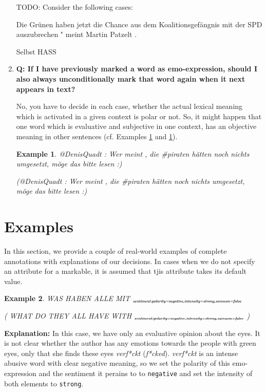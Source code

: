 \documentclass[11pt,a4paper]{article}
\theoremstyle{mytheoremstyle}
\newtheorem{exmp}{Example}[section]
\newcommand{\mtag}[2]{{\upshape[\emph{#2}\upshape]$_{\textrm{\bfseries\emph{\tiny
        #1}}}$}}
\newcommand{\sentiment}[2][]{\mtag{sen\-ti\-ment\ifstrempty{#1}{}{:#1}}{#2}}
\newcommand{\target}[2][]{\mtag{tar\-get\ifstrempty{#1}{}{:#1}}{#2}}
\newcommand{\emoexpression}[2][]{\mtag{emo-\-ex\-pression\ifstrempty{#1}{}{:#1}}{#2}}
\begin{document}
\begin{enumerate}
TODO: Consider the following cases:

Die Gr\"unen haben jetzt die Chance aus dem Koalitionsgef\"angnis mit
der SPD auszubrechen " meint Martin Patzelt .

Selbst HASS

\item\textbf{Q: If I have previously marked a word as emo-expression,
  should I also always unconditionally mark that word again when it
  next appears in text?}

No, you have to decide in each case, whether the actual lexical
meaning which is activated in a given context is polar or not.  So, it
might happen that one word which is evaluative and subjective in one
context, has an objective meaning in other sentences (cf. Examples
\ref{} and \ref{}).

\begin{exmp}
  @DenisQuadt : Wer meint , die \#piraten h\"atten noch nichts
  umgesetzt, m\"oge das bitte lesen :)

{\footnotesize(@DenisQuadt : Wer meint , die \#piraten h\"atten noch
  nichts umgesetzt, m\"oge das bitte lesen :)}\label{exmp:no-emoexpr}
\end{exmp}



\end{enumerate}

\section{Examples}

In this section, we provide a couple of real-world examples of
complete annotations with explanations of our decisions.  In cases
when we do not specify an attribute for a markable, it is assumed that
tjis attribute takes its default value.

\begin{exmp}
  \footnotesize WAS HABEN ALLE MIT
  \sentiment[polarity=negative,intensity=strong,sarcasm=false]{IHREN
    \emoexpression[polarity=negative,intensity=strong,sarcasm=false]{VERF*CKTEN}
    \target{GR\"UNEN AUGEN}}

  {\scriptsize( WHAT DO THEY ALL HAVE WITH
    \sentiment[polarity=negative,intensity=strong,sarcasm=false]{THEIR
      \emoexpression[polarity=negative,intensity=strong,sarcasm=false]{F*CKED}
      \target{GREEN EYES}} )}\label{exmp:sarcasm}
\end{exmp}

\textbf{Explanation:} In this case, we have only an evaluative opinion
about the eyes.  It is not clear whether the author has any emotions
towards the people with green eyes, only that she finds these eyes
\textit{verf*ckt} (\textit{f*cked}).  \textit{verf*ckt} is an intense
abusive word with clear negative meaning, so we set the polarity of
this emo-expression and the sentiment it perains to to
\texttt{negative} and set the intensity of both elements to
\texttt{strong}.
\end{document}
